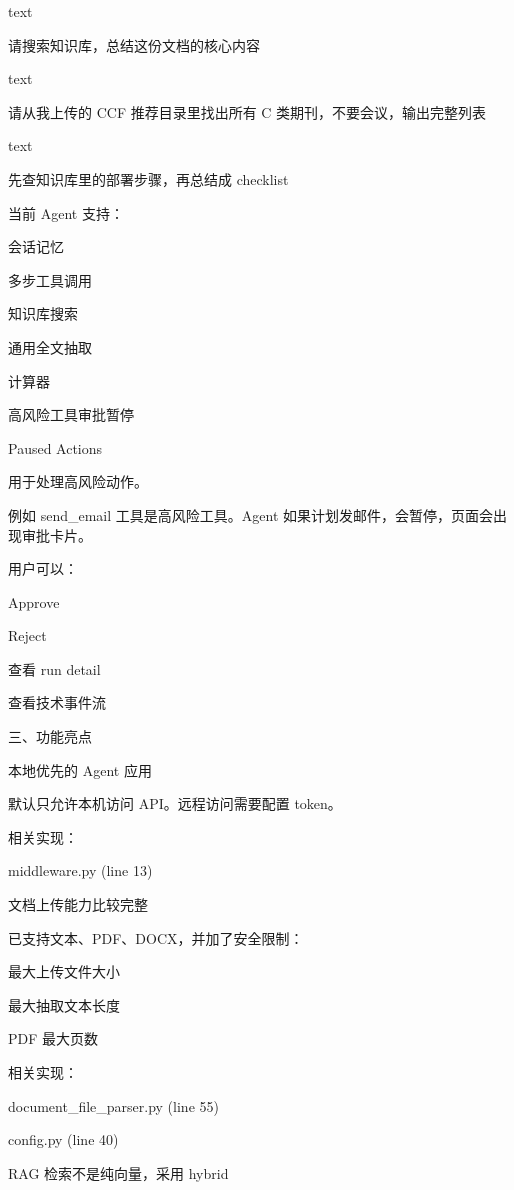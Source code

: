text



请搜索知识库，总结这份文档的核心内容



text



请从我上传的 CCF 推荐目录里找出所有 C 类期刊，不要会议，输出完整列表



text



先查知识库里的部署步骤，再总结成 checklist



当前 Agent 支持：


会话记忆

多步工具调用

知识库搜索

通用全文抽取

计算器

高风险工具审批暂停




Paused Actions

用于处理高风险动作。

例如 send_email 工具是高风险工具。Agent 如果计划发邮件，会暂停，页面会出现审批卡片。

用户可以：


Approve

Reject

查看 run detail

查看技术事件流




三、功能亮点


本地优先的 Agent 应用

默认只允许本机访问 API。远程访问需要配置 token。

相关实现：


middleware.py (line 13)




文档上传能力比较完整

已支持文本、PDF、DOCX，并加了安全限制：


最大上传文件大小

最大抽取文本长度

PDF 最大页数


相关实现：


document_file_parser.py (line 55)

config.py (line 40)




RAG 检索不是纯向量，采用 hybrid

